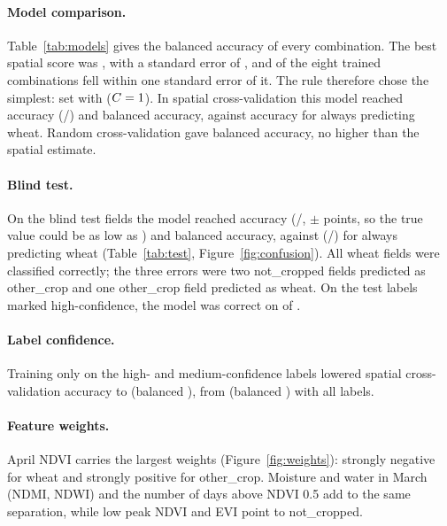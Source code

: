 \documentclass[10pt]{article}
\begin{document}
\paragraph{Model comparison.} Table~\ref{tab:models} gives the balanced accuracy of every combination.
The best spatial score was \TopBal, with a standard error of \SE, and \NNearTop{} of the eight trained
combinations fell within one standard error of it. The rule therefore chose the simplest: set
\ChosenSet{} with \ChosenModel{} ($C = 1$). In spatial cross-validation this model reached
\CVAcc{} accuracy (\CVCorrect/\NTrain) and \CVBal{} balanced accuracy, against \BaselineTrain{} accuracy
for always predicting wheat. Random cross-validation gave \RandomBal{} balanced accuracy, no higher than
the spatial estimate.

\paragraph{Blind test.} On the \NTest{} blind test fields the model reached \TestAcc{} accuracy
(\TestCorrect/\NTest, $\pm$\TestMargin{} points, so the true value could be as low as \TestLow) and
\TestBal{} balanced accuracy, against \BaselineTest{} (\TestBaselineCorrect/\NTest) for always
predicting wheat (Table~\ref{tab:test}, Figure~\ref{fig:confusion}). All wheat fields were classified
correctly; the three errors were two not\_cropped fields predicted as other\_crop and one other\_crop
field predicted as wheat. On the test labels marked high-confidence, the model was correct on
\NHighCorrect{} of \NHigh.

\paragraph{Label confidence.} Training only on the \NTrainHighMed{} high- and medium-confidence labels
lowered spatial cross-validation accuracy to \ConfCleanAcc{} (balanced \ConfCleanBal), from
\ConfAllAcc{} (balanced \ConfAllBal) with all \NTrain{} labels.

\paragraph{Feature weights.} April NDVI carries the largest weights (Figure~\ref{fig:weights}): strongly
negative for wheat and strongly positive for other\_crop. Moisture and water in March (NDMI, NDWI) and
the number of days above NDVI 0.5 add to the same separation, while low peak NDVI and EVI point to
not\_cropped.
\end{document}
